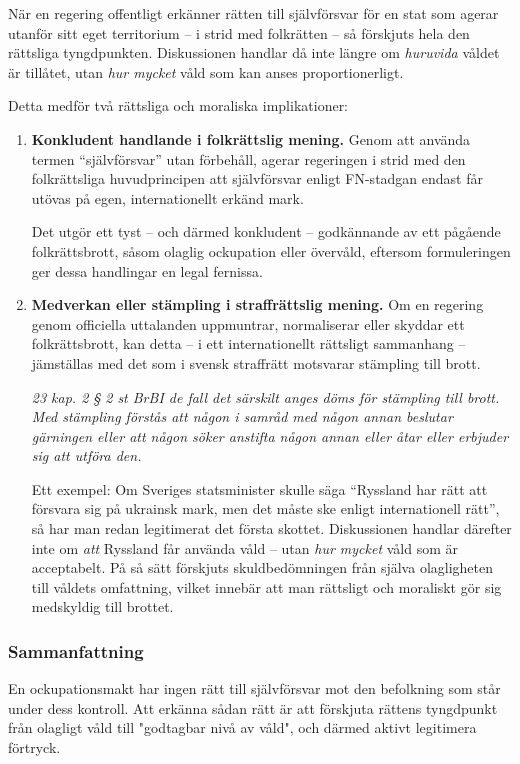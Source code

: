 \documentclass[12pt]{article}
\newcommand{\lagrum}[1]{\par\vspace{3mm}\textit{#1}\par\vspace{5mm}}
\begin{document}
När en regering offentligt erkänner rätten till självförsvar för en stat som agerar utanför sitt eget territorium – i strid med folkrätten – så förskjuts hela den rättsliga tyngdpunkten. Diskussionen handlar då inte längre om \textit{huruvida} våldet är tillåtet, utan \textit{hur mycket} våld som kan anses proportionerligt.

Detta medför två rättsliga och moraliska implikationer:

\begin{enumerate}
  \item \textbf{Konkludent handlande i folkrättslig mening.}  
  Genom att använda termen \enquote{självförsvar} utan förbehåll, agerar regeringen i strid med den folkrättsliga huvudprincipen att självförsvar enligt FN-stadgan endast får utövas på egen, internationellt erkänd mark.

  Det utgör ett tyst – och därmed konkludent – godkännande av ett pågående folkrättsbrott, såsom olaglig ockupation eller övervåld, eftersom formuleringen ger dessa handlingar en legal fernissa.

 \item \textbf{Medverkan eller stämpling i straffrättslig mening.}  
Om en regering genom officiella uttalanden uppmuntrar, normaliserar eller skyddar ett folkrättsbrott, kan detta – i ett internationellt rättsligt sammanhang – jämställas med det som i svensk straffrätt motsvarar stämpling till brott.

\lagrum{23 kap. 2 § 2 st BrB\quad  I de fall det särskilt anges döms för stämpling till brott. Med stämpling förstås att någon i samråd med någon annan beslutar gärningen eller att någon söker anstifta någon annan eller åtar eller erbjuder sig att utföra den.}

Ett exempel: Om Sveriges statsminister skulle säga \enquote{Ryssland har rätt att försvara sig på ukrainsk mark, men det måste ske enligt internationell rätt}, så har man redan legitimerat det första skottet. Diskussionen handlar därefter inte om \textit{att} Ryssland får använda våld – utan \textit{hur mycket} våld som är acceptabelt. På så sätt förskjuts skuldbedömningen från själva olagligheten till våldets omfattning, vilket innebär att man rättsligt och moraliskt gör sig medskyldig till brottet.
\end{enumerate}

\subsubsection*{Sammanfattning}
\noindent En ockupationsmakt har ingen rätt till självförsvar mot den befolkning som står under dess kontroll. Att erkänna sådan rätt är att förskjuta rättens tyngdpunkt från olagligt våld till "godtagbar nivå av våld", och därmed aktivt legitimera förtryck. 
\end{document}
